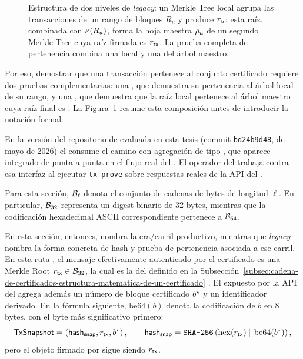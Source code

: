 \begin{figure}[!b]
	\caption{Estructura de dos niveles de \CardanoTransactions \textit{legacy}: un Merkle Tree local agrupa las transacciones de un rango de bloques $R_u$ y produce \(r_{u}\); esta raíz, combinada con \(\kappa(R_u)\), forma la hoja maestra \(\rho_{u}\) de un segundo Merkle Tree cuya raíz firmada es \(r_{\mathsf{tx}}\). La prueba completa de pertenencia combina una \RangeProof local y una \MasterProof del árbol maestro.}
	\label{fig:mithril-recursive-merkle-proofs}
\end{figure}


Por eso, demostrar que una transacción pertenece al conjunto certificado requiere dos pruebas complementarias: una \RangeProof, que demuestra su pertenencia al árbol local de su rango, y una \MasterProof, que demuestra que la raíz local pertenece al árbol maestro cuya raíz final es \TxSetRoot. La Figura~\ref{fig:mithril-recursive-merkle-proofs} resume esta composición antes de introducir la notación formal.

En la versión del repositorio de \Mithril evaluada en esta tesis (commit \texttt{bd24b9d48}, de mayo de 2026) el \zkBridge consume el camino \Pythagoras con agregación de tipo \Concatenation, que aparece integrado de punta a punta en el flujo real del \MithrilAggregator \cite{MithrilDocsAggregator}. El operador del \zkBridge trabaja contra esa interfaz al ejecutar \texttt{tx prove} sobre respuestas reales de la API del \MithrilAggregator.

Para esta sección, $\mathcal{B}_{\ell}$ denota el conjunto de cadenas de bytes de longitud $\ell$. En particular, $\mathcal{B}_{32}$ representa un digest binario de 32 bytes, mientras que la codificación hexadecimal ASCII correspondiente pertenece a $\mathcal{B}_{64}$.

En esta sección, entonces, \Pythagoras nombra la era/carril productivo, mientras que \textit{legacy} nombra la forma concreta de hash y prueba de pertenencia asociada a ese carril. En esta ruta \LegacyHashScheme, el mensaje efectivamente autenticado por el certificado es una Merkle Root $r_{\mathsf{tx}} \in \mathcal{B}_{32}$, la cual es la del \ProtocolMsg definido en la Subsección~\ref{subsec:cadena-de-certificados-estructura-matematica-de-un-certificado} \cite{MithrilSTMRepo}. El \TransactionSnapshot expuesto por la API del \MithrilAggregator agrega además un número de bloque certificado $b^\star$ y un identificador derivado. En la fórmula siguiente, $\mathrm{be64}(b)$ denota la codificación de $b$ en 8 bytes, con el byte más significativo primero:
$$\mathsf{TxSnapshot} = \left(\mathsf{hash}_{\mathsf{snap}}, r_{\mathsf{tx}}, b^\star\right), \qquad \mathsf{hash}_{\mathsf{snap}} = \texttt{SHA-256} \left(\mathrm{hex}(r_{\mathsf{tx}}) \mathbin{\|} \mathrm{be64}(b^\star) \right),$$
pero el objeto firmado por \Mithril sigue siendo $r_{\mathsf{tx}}$.

